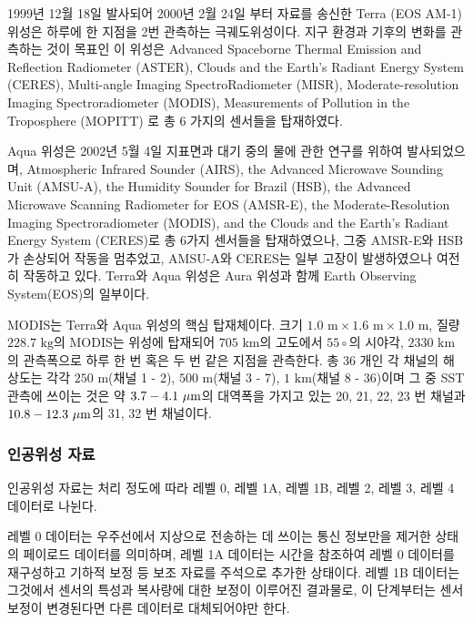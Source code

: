 1999년 12월 18일 발사되어 2000년 2월 24일 부터 자료를 송신한 Terra (EOS AM-1) 위성은 하루에 한 지점을 2번 관측하는 극궤도위성이다. 지구 환경과 기후의 변화를 관측하는 것이 목표인 이 위성은 Advanced Spaceborne Thermal Emission and Reflection Radiometer (ASTER), Clouds and the Earth's Radiant Energy System (CERES), Multi-angle Imaging SpectroRadiometer (MISR), Moderate-resolution Imaging Spectroradiometer (MODIS),  Measurements of Pollution in the Troposphere (MOPITT) 로 총 6 가지의 센서들을 탑재하였다. 

Aqua 위성은 2002년 5월 4일 지표면과 대기 중의 물에 관한 연구를 위하여 발사되었으며, Atmospheric Infrared Sounder (AIRS), the Advanced Microwave Sounding Unit (AMSU-A), the Humidity Sounder for Brazil (HSB), the Advanced Microwave Scanning Radiometer for EOS (AMSR-E), the Moderate-Resolution Imaging Spectroradiometer (MODIS), and the Clouds and the Earth's Radiant Energy System (CERES)로 총 6가지 센서들을 탑재하였으나, 그중 AMSR-E와 HSB가 손상되어 작동을 멈추었고, AMSU-A와 CERES는 일부 고장이 발생하였으나 여전히 작동하고 있다. Terra와 Aqua 위성은 Aura 위성과 함께 Earth Observing System(EOS)의 일부이다. 

MODIS는 Terra와 Aqua 위성의 핵심 탑재체이다. 크기 $1.0\textrm{ m} \times 1.6 \textrm{ m} \times 1.0 \textrm{ m}$, 질량 $228.7 \textrm{ kg}$의 MODIS는 위성에 탑재되어 $705 \textrm{ km}$의 고도에서 $55 \circ$의 시야각, $2330 \textrm{ km}$의 관측폭으로 하루 한 번 혹은 두 번 같은 지점을 관측한다. 총 36 개인 각 채널의 해상도는 각각 $250 \textrm{ m}$(채널 1 - 2), $500 \textrm{ m}$(채널 3 - 7), $1 \textrm{ km}$(채널 8 - 36)이며 그 중 SST 관측에 쓰이는 것은 약 $3.7 - 4.1 \textrm{ }\rm{\mu m}$의 대역폭을 가지고 있는 20, 21, 22, 23 번 채널과 $10.8 - 12.3 \textrm{ }\rm{\mu m}$의 31, 32 번 채널이다.

\subsubsection{인공위성 자료}

인공위성 자료는 처리 정도에 따라 레벨 0, 레벨 1A, 레벨 1B, 레벨 2, 레벨 3, 레벨 4 데이터로 나뉜다\cite{Level}. 

레벨 0 데이터는 우주선에서 지상으로 전송하는 데 쓰이는 통신 정보만을 제거한 상태의 페이로드 데이터를 의미하며, 레벨 1A 데이터는 시간을 참조하여 레벨 0 데이터를 재구성하고 기하적 보정 등 보조 자료를 주석으로 추가한 상태이다. 레벨 1B 데이터는 그것에서 센서의 특성과 복사량에 대한 보정이 이루어진 결과물로, 이 단계부터는 센서 보정이 변경된다면 다른 데이터로 대체되어야만 한다. 

